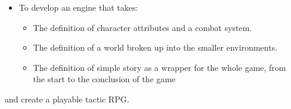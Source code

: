 \begin{itemize}
\item To develop an engine that takes:

\begin{itemize}
\item The definition of character attributes and a combat system.

\item The definition of a world broken up into the smaller environments.

\item The definition of simple story as a wrapper for the whole game, from\\
 the start to the conclusion of the game

\end{itemize}

\end{itemize}

and create a playable tactic RPG. 

